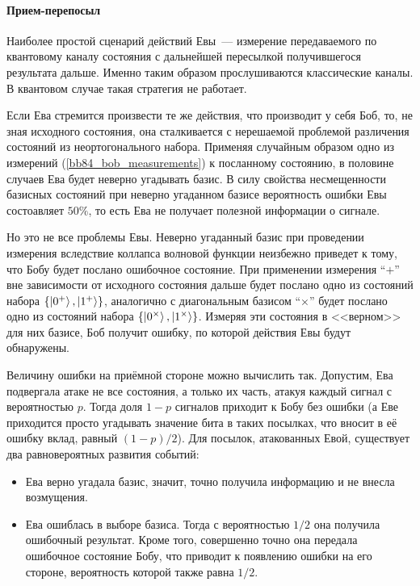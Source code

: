 \paragraph{Прием-перепосыл}
Наиболее простой сценарий действий Евы~--- измерение передаваемого по квантовому каналу состояния с дальнейшей пересылкой получившегося результата дальше. Именно таким образом прослушиваются классические каналы. В квантовом случае такая стратегия не работает.

Если Ева стремится произвести те же действия, что производит у себя Боб, то, не зная исходного состояния, она сталкивается с нерешаемой проблемой различения состояний из неортогонального набора. 
Применяя случайным образом одно из измерений (\ref{bb84_bob_measurements})
к посланному состоянию, в половине случаев Ева будет неверно угадывать базис. В силу свойства несмещенности базисных состояний при неверно угаданном базисе вероятность ошибки Евы состоавляет $50\%$, то есть Ева не получает полезной информации о сигнале.

Но это не все проблемы Евы. Неверно угаданный базис при проведении измерения вследствие коллапса волновой функции неизбежно приведет к тому, что Бобу будет послано ошибочное состояние. При применении измерения ``$+$'' вне зависимости от исходного состояния дальше будет послано одно из состояний набора $\{\left| 0^+ \right\rangle, \left| 1^+ \right\rangle\}$, аналогично с диагональным базисом ``$\times$'' будет послано одно из состояний набора $\{\left| 0^\times \right\rangle, \left| 1^\times \right\rangle\}$. Измеряя эти состояния в <<верном>> для них базисе, Боб получит ошибку, по которой действия Евы будут обнаружены.

Величину ошибки на приёмной стороне можно вычислить так. Допустим, Ева подвергала атаке не все состояния, а только их часть, атакуя каждый сигнал с вероятностью $p$. Тогда доля $1-p$ сигналов приходит к Бобу без ошибки (а Еве приходится просто угадывать значение бита в таких посылках, что вносит в её ошибку вклад, равный $(1-p)/2$). 
Для посылок, атакованных Евой, существует два равновероятных развития событий:
\begin{itemize}
  \item Ева верно угадала базис, значит, точно получила информацию и не внесла возмущения.
  \item Ева ошиблась в выборе базиса. Тогда с вероятностью $1/2$ она получила ошибочный результат. Кроме того, совершенно точно она передала ошибочное состояние Бобу, что приводит к появлению ошибки на его стороне, вероятность которой также равна $1/2$. 
\end{itemize}

